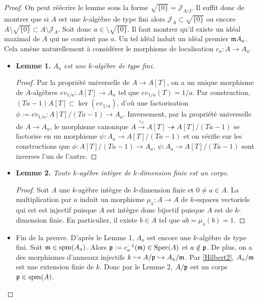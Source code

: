  \begin{proof}On peut réécrire le lemme sous la forme $\sqrt{\lbrace 0\rbrace}=\mathcal{J}_{A/I}$. Il suffit donc de montrer que si $A$ est une $k$-algèbre de type fini alors $\mathcal{J}_{A }\subset \sqrt{\lbrace 0\rbrace}$ ou encore $A\setminus \sqrt{\lbrace 0\rbrace}\subset A\setminus \mathcal{J}_A$.  Soit donc  $a\in\setminus \sqrt{\lbrace 0\rbrace}$. Il faut montrer qu'il existe un idéal maximal de $A $ qui ne contient pas $a$. Un tel idéal induit un idéal premier $\frak{m}A_a$. Cela amène naturellement à considérer  le morphisme de localisation  $c_a:A\rightarrow A_a$. \\

\begin{itemize}[leftmargin=* ,parsep=0cm,itemsep=0cm,topsep=0cm]
\item\textbf{Lemme 1.} \textit{$A_a$ est une $k$-algèbre de type fini.}

 \begin{proof} Par la propriété universelle de $ A\rightarrow A[T]$, on a un unique morphisme de $A$-algèbres $ev_{1/a}:A[T]\rightarrow A_a$ tel que $ev_{1/a}(T)=1/a$. Par construction,  $(Ta-1)A[T]\subset \ker(ev_{1/a})$, d'où une factorisation $\phi :=\overline{ev}_{1/a}:A[T]/(Ta-1)\rightarrow A_a$. Inversement, par la propriété universelle de $ A\rightarrow A_a$, le morphisme canonique $ A\stackrel{\iota_A}{\rightarrow}A[T]\twoheadrightarrow A[T]/(Ta-1)$ se factorise en un morphisme $\psi:A_a\rightarrow A[T]/(Ta-1)$ et on vérifie sur les constructions que $\phi: A[T]/(Ta-1)\rightarrow A_a$, $\psi:A_a\rightarrow A[T]/(Ta-1)$ sont inverses l'un de l'autre.\end{proof}

 \item\textbf{Lemme 2.}  \textit{Toute $k$-agèbre intègre de $k$-dimension finie est un corps.}

 \begin{proof} Soit $A$ une $k$-agèbre intègre de $k$-dimension finie et $0\not=a\in A$. La multiplication par $a$ induit un morphisme $\mu_a:A\rightarrow A$ de $k$-espaces vectoriels qui est est injectif puisque $A$ est intègre donc bijectif puisque $A$ est de $k$-dimension finie. En particulier, il existe $b\in A$ tel que $ab=\mu_a(b)=1$. \end{proof}
 \item Fin de la preuve. D'après le Lemme 1, $A_a$ est encore une $k$-algèbre de type fini. Soit $\frak{m}\in \operatorname{spm}(A_a)$. Alors $\frak{p}:=c_a^{-1}(\frak{m})\in \operatorname{Spec}(A)$ et $a\notin \frak{p}$. De plus, on a des morphismes d'anneaux injectifs $k\hookrightarrow A/\frak{p}\hookrightarrow A_a/\frak{m}$. Par \ref{Hilbert2}, $A_a/\frak{m}$ est une extension finie de $k$. Donc par le Lemme 2, $A/\frak{p}$ est   un corps \ie{} $\frak{p}\in \operatorname{spm}(A)$.
 \end{itemize}
 \end{proof}

